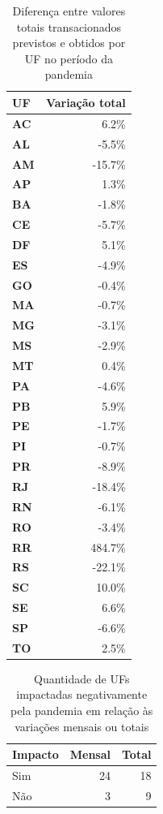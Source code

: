 \begin{table}[htb]
\centering
\caption{Diferença entre valores totais transacionados previstos e obtidos por UF no período da pandemia}
\label{tab:pandemia:variacao-total-por-uf}
    \begin{tabular}{l|r}
        \toprule
        \textbf{UF} & Variação total \\
        \midrule
        \textbf{AC} &   6.2\% \\
        \textbf{AL} &  -5.5\% \\
        \textbf{AM} & -15.7\% \\
        \textbf{AP} &   1.3\% \\
        \textbf{BA} &  -1.8\% \\
        \textbf{CE} &  -5.7\% \\
        \textbf{DF} &   5.1\% \\
        \textbf{ES} &  -4.9\% \\
        \textbf{GO} &  -0.4\% \\
        \textbf{MA} &  -0.7\% \\
        \textbf{MG} &  -3.1\% \\
        \textbf{MS} &  -2.9\% \\
        \textbf{MT} &   0.4\% \\
        \textbf{PA} &  -4.6\% \\
        \textbf{PB} &   5.9\% \\
        \textbf{PE} &  -1.7\% \\
        \textbf{PI} &  -0.7\% \\
        \textbf{PR} &  -8.9\% \\
        \textbf{RJ} & -18.4\% \\
        \textbf{RN} &  -6.1\% \\
        \textbf{RO} &  -3.4\% \\
        \textbf{RR} & 484.7\% \\
        \textbf{RS} & -22.1\% \\
        \textbf{SC} &  10.0\% \\
        \textbf{SE} &   6.6\% \\
        \textbf{SP} &  -6.6\% \\
        \textbf{TO} &   2.5\% \\
        \bottomrule
    \end{tabular}
\fdadospesquisa
\end{table}

\begin{table}[htb]
\centering
\caption{Quantidade de UFs impactadas negativamente pela pandemia em relação às variações mensais ou totais}
\label{tab:pandemia:impacto-por-uf}
    \begin{tabular}{l|r|r}
        \toprule
        Impacto & Mensal & Total \\
        \midrule
        Sim & 24 & 18 \\
        Não &  3 &  9 \\
        \bottomrule
    \end{tabular}
\fdadospesquisa
\end{table}

